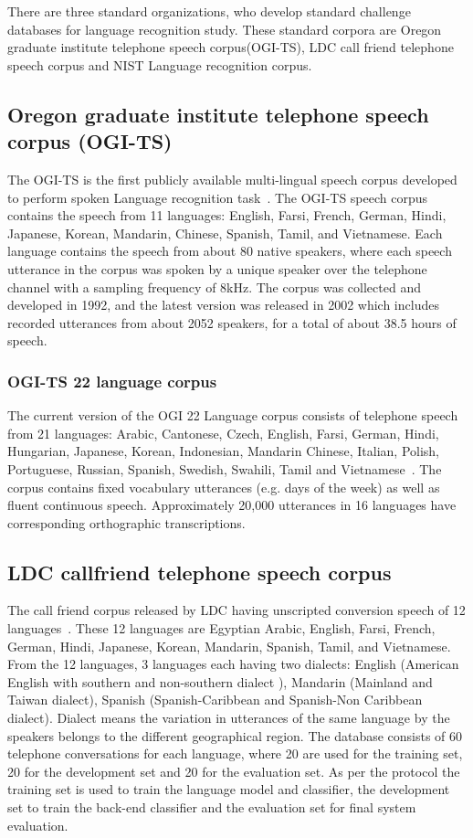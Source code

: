 \begin{spacing}{1.5}
There are three standard organizations, who develop standard challenge databases for language recognition study. These standard corpora are Oregon graduate institute telephone speech corpus(OGI-TS), LDC call friend telephone speech corpus and NIST Language recognition corpus.

\subsection{Oregon graduate institute telephone speech corpus (OGI-TS)}
The OGI-TS is the first publicly available multi-lingual speech corpus developed to perform spoken Language recognition task~\cite{muthusamy1992ogi}. The OGI-TS speech corpus contains the speech from 11 languages: English, Farsi, French, German, Hindi, Japanese, Korean, Mandarin, Chinese, Spanish, Tamil, and Vietnamese. Each language contains the speech from about 80 native speakers, where each speech utterance in the corpus was spoken by a unique speaker over the telephone channel with a sampling frequency of 8kHz. The corpus was collected and developed in 1992, and the latest version was released in 2002 which includes recorded utterances from about 2052 speakers, for a total of about 38.5 hours of speech.
\subsubsection{OGI-TS 22 language corpus}
The current version of the OGI 22 Language corpus consists of telephone speech from 21 languages: Arabic, Cantonese, Czech, English, Farsi, German, Hindi, Hungarian, Japanese, Korean, Indonesian, Mandarin Chinese, Italian, Polish, Portuguese, Russian, Spanish, Swedish, Swahili, Tamil and Vietnamese~\cite{lander1995ogi}. The corpus contains fixed vocabulary utterances (e.g. days of the week) as well as fluent continuous speech. Approximately 20,000 utterances in 16 languages have corresponding orthographic transcriptions.


\subsection{LDC callfriend telephone speech corpus}
The call friend corpus released by LDC having unscripted conversion speech of 12 languages~\cite{ambikairajah2011language,li2013spoken}. These 12 languages are Egyptian Arabic, English, Farsi, French, German, Hindi, Japanese, Korean, Mandarin, Spanish, Tamil, and Vietnamese. From the 12 languages, 3 languages each having two dialects: English (American English with southern and non-southern dialect ), Mandarin (Mainland and Taiwan dialect), Spanish (Spanish-Caribbean and Spanish-Non Caribbean dialect). Dialect means the variation in utterances of the same language by the speakers belongs to the different geographical region. The database consists of 60 telephone conversations for each language, where 20 are used for the training set, 20 for the development set and 20 for the evaluation set. As per the protocol the training set is used to train the language model and classifier, the development set to train the back-end classifier and the evaluation set for final system evaluation.   

\end{spacing}
